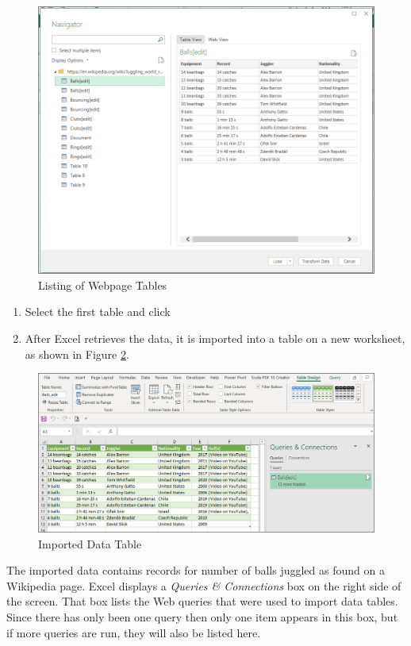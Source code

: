 \begin{figure}[H]
	\centering
	\includegraphics[width=\maxwidth{.95\linewidth}]{gfx/ch07_fig02b}
	\caption{Listing of Webpage Tables}
	\label{07:fig02b}
\end{figure}

\begin{enumerate}[resume]
	\item Select the first table and click 
	\item After Excel retrieves the data, it is imported into a table on a new worksheet, as shown in Figure \ref{07:fig02c}.
\end{enumerate}

\begin{figure}[H]
	\centering
	\includegraphics[width=\maxwidth{.95\linewidth}]{gfx/ch07_fig02c}
	\caption{Imported Data Table}
	\label{07:fig02c}
\end{figure}

The imported data contains records for number of balls juggled as found on a Wikipedia page. Excel displays a \textit{Queries \& Connections} box on the right side of the screen. That box lists the Web queries that were used to import data tables. Since there has only been one query then only one item appears in this box, but if more queries are run, they will also be listed here. 

